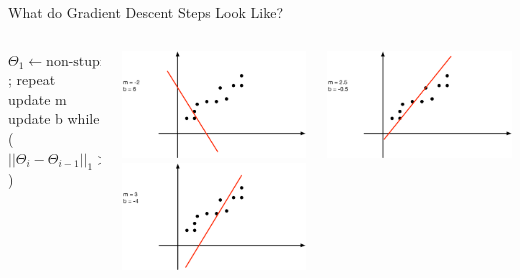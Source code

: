 \documentclass[aspectratio=169]{beamer}
\begin{document}
\begin{frame}[fragile]{What do Gradient Descent Steps Look Like?}

\begin{columns}[c]
\begin{column}{0.4\textwidth}

\begin{SQL}
$\Theta_1 \leftarrow \textrm{non-stupid guess for } \Theta^*$;
repeat {
 update m
 update b
 } while ($||\Theta_{i} - \Theta_{i - 1}||_1 > \epsilon$)
\end{SQL} 
\end{column}
\begin{column}{0.3\textwidth}
\includegraphics[width=1\textwidth]{lectGD/step1.pdf}\\
\includegraphics[width=1\textwidth]{lectGD/step2.pdf}
\end{column}
\begin{column}{0.3\textwidth}
\includegraphics[width=1\textwidth]{lectGD/step3.pdf}\\

\end{column}
\end{columns}
\end{frame}
\end{document}
